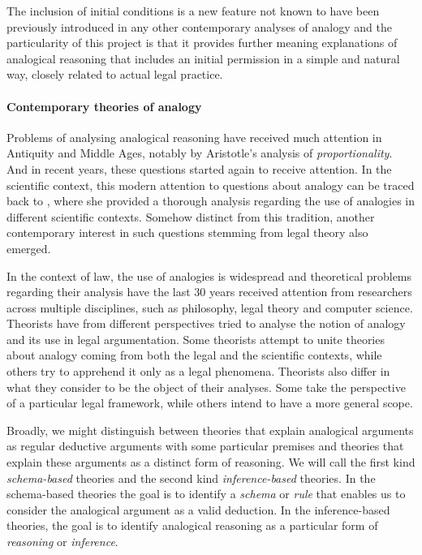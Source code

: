 		The inclusion of initial conditions is a new feature not known to have been previously introduced in any other contemporary analyses of analogy and the particularity of this project is that it provides further meaning explanations of analogical reasoning that includes an initial permission in a simple and natural way, closely related to actual legal practice. 
        
        \paragraph{Contemporary theories of analogy}
        
        	Problems of analysing analogical reasoning have received much attention in Antiquity and Middle Ages, notably by Aristotle's analysis of \textit{proportionality}. And in recent years, these questions started again to receive attention. In the scientific context, this modern attention to questions about analogy can be traced back to  , where she provided a thorough analysis regarding the use of analogies in different scientific contexts. Somehow distinct from this tradition, another contemporary interest in such questions stemming from legal theory also emerged. 
        	
        	In the context of law, the use of analogies is widespread and theoretical problems regarding their analysis have the last 30 years received attention from researchers across multiple disciplines, such as philosophy, legal theory and computer science. Theorists have from different perspectives tried to analyse the notion of analogy and its use in legal argumentation. Some theorists attempt to unite theories about analogy coming from both the legal and the scientific contexts, while others try to apprehend it only as a legal phenomena. Theorists also differ in what they consider to be the object of their analyses. Some take the perspective of a particular legal framework, while others intend to have a more general scope. 
        
        	Broadly, we might distinguish between theories that explain analogical arguments as regular deductive arguments with some particular premises and theories that explain these arguments as a distinct form of reasoning. We will call the first kind \textit{schema-based} theories and the second kind \textit{inference-based} theories. In the schema-based theories the goal is to identify a \textit{schema} or \textit{rule} that enables us to consider the analogical argument as a valid deduction. In the inference-based theories, the goal is to identify analogical reasoning as a particular form of \textit{reasoning} or \textit{inference}. 
        	
